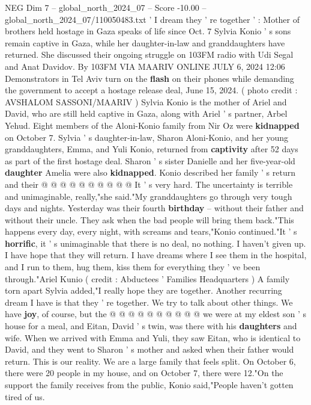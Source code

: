 \begin{textsample}{NEG Dim 7 – global\_north\_2024\_07 – Score -10.00 – global\_north\_2024\_07/110050483.txt}  \label{ex:f7_neg_111}
' I dream they ' re together ' : Mother of brothers held hostage in Gaza speaks of life since Oct. 7 Sylvia Konio ' s sons remain captive in Gaza, while her daughter-in-law and granddaughters have returned.
She discussed their ongoing struggle on 103FM radio with Udi Segal and Anat Davidov.
By 103FM VIA MAARIV ONLINE JULY 6, 2024 12:06 Demonstrators in Tel Aviv turn on the \textbf{flash} on their phones while demanding the government to accept a hostage release deal, June 15, 2024. ( photo credit : AVSHALOM SASSONI/MAARIV ) Sylvia Konio is the mother of Ariel and David, who are still held captive in Gaza, along with Ariel ' s partner, Arbel Yehud.
Eight members of the Aloni-Konio family from Nir Oz were \textbf{kidnapped} on October 7.
Sylvia ' s daughter-in-law, Sharon Aloni-Konio, and her young granddaughters, Emma, and Yuli Konio, returned from \textbf{captivity} after 52 days as part of the first hostage deal.
Sharon ' s sister Danielle and her five-year-old \textbf{daughter} Amelia were also \textbf{kidnapped}.
Konio described her family ' s return and their @ @ @ @ @ @ @ @ @ @ It ' s very hard.
The uncertainty is terrible and unimaginable, really,"she said."My granddaughters go through very tough days and nights.
Yesterday was their fourth \textbf{birthday} -- without their father and without their uncle.
They ask when the bad people will bring them back."This happens every day, every night, with screams and tears,"Konio continued."It ' s \textbf{horrific}, it ' s unimaginable that there is no deal, no nothing.
I haven't given up.
I have hope that they will return.
I have dreams where I see them in the hospital, and I run to them, hug them, kiss them for everything they ' ve been through."Ariel Kunio ( credit : Abductees ' Families Headquarters ) A family torn apart Sylvia added,"I really hope they are together.
Another recurring dream I have is that they ' re together.
We try to talk about other things.
We have \textbf{joy}, of course, but the @ @ @ @ @ @ @ @ @ @ we were at my eldest son ' s house for a meal, and Eitan, David ' s twin, was there with his \textbf{daughters} and wife.
When we arrived with Emma and Yuli, they saw Eitan, who is identical to David, and they went to Sharon ' s mother and asked when their father would return.
This is our reality.
We are a large family that feels split.
On October 6, there were 20 people in my house, and on October 7, there were 12."On the support the family receives from the public, Konio said,"People haven't gotten tired of us.

\end{textsample}

